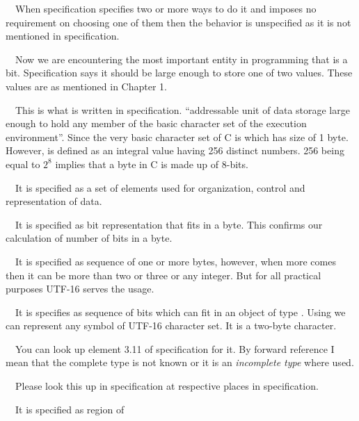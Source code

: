 \item{}~~When
  specification specifies two or more ways to do it and imposes no
  requirement on choosing one of them then the behavior is unspecified
  as it is not mentioned in specification.
\item{}\textreference[bit]~~Now we are encountering the most
  important entity in programming that is a bit. Specification says it
  should be large enough to store one of two values. These
  values are as mentioned in Chapter 1.
\item{}\textreference[byte]~~This is what is written in
  specification. ``addressable unit of data storage large enough to
  hold any member of the basic character set of the execution
  environment''. Since the very basic character set of C is
   which has size
  of 1 byte. However,  is defined as an integral value
  having 256 distinct numbers. 256 being equal to $2^8$ implies that a
  byte in C is made up of 8-bits.
\item{}\textreference[character]~~It is specified as a
  set of elements used for organization, control and representation of
  data.
  \startitemize[R]
\item{}~~It is specified as bit representation that fits in a
  byte. This confirms our calculation of number of bits in a byte.
\item{}~~It is specified as sequence of one or more bytes,
  however, when more comes then it can be more than two or three or
  any integer. But for all practical purposes UTF-16 serves the usage.
\item{}~~It is
  specifies as sequence of bits which can fit in an object of type
  . Using  we can represent any symbol of
  UTF-16 character set. It is a two-byte character.
\stopitemize
\item{}~~You
  can look up element 3.11 of specification for it. By forward
  reference I mean that the complete type is not known or it is an
  {\it incomplete type} where used.
\item{}\textreference[3.12 and 3.13]~~Please look
  this up in specification at respective places in specification.
\item{}\textreference[object]~~It is specified as region of
